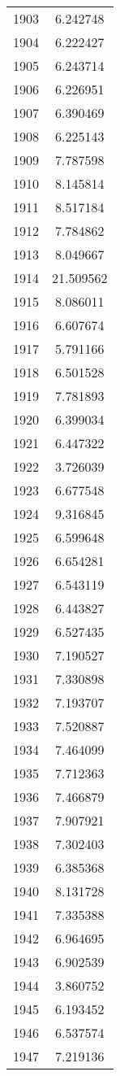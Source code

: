 \documentclass[12pt]{article}
\begin{document}
\begin{longtable}{@{}cc@{}}
1903 & 6.242748 \\
1904 & 6.222427 \\
1905 & 6.243714 \\
1906 & 6.226951 \\
1907 & 6.390469 \\
1908 & 6.225143 \\
1909 & 7.787598 \\
1910 & 8.145814 \\
1911 & 8.517184 \\
1912 & 7.784862 \\
1913 & 8.049667 \\
1914 & 21.509562 \\
1915 & 8.086011 \\
1916 & 6.607674 \\
1917 & 5.791166 \\
1918 & 6.501528 \\
1919 & 7.781893 \\
1920 & 6.399034 \\
1921 & 6.447322 \\
1922 & 3.726039 \\
1923 & 6.677548 \\
1924 & 9.316845 \\
1925 & 6.599648 \\
1926 & 6.654281 \\
1927 & 6.543119 \\
1928 & 6.443827 \\
1929 & 6.527435 \\
1930 & 7.190527 \\
1931 & 7.330898 \\
1932 & 7.193707 \\
1933 & 7.520887 \\
1934 & 7.464099 \\
1935 & 7.712363 \\
1936 & 7.466879 \\
1937 & 7.907921 \\
1938 & 7.302403 \\
1939 & 6.385368 \\
1940 & 8.131728 \\
1941 & 7.335388 \\
1942 & 6.964695 \\
1943 & 6.902539 \\
1944 & 3.860752 \\
1945 & 6.193452 \\
1946 & 6.537574 \\
1947 & 7.219136 \\

\end{longtable}
\end{document}
